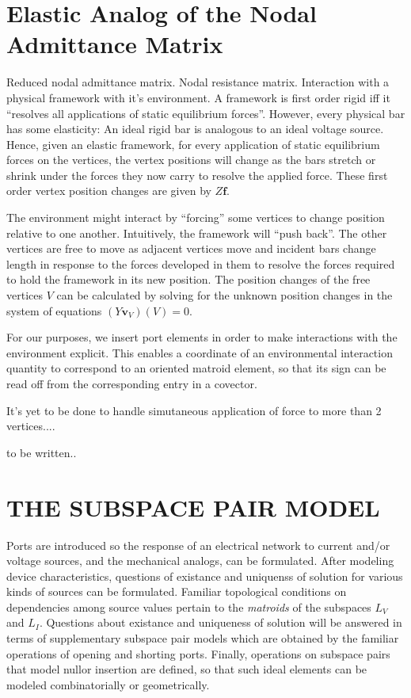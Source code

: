 \documentclass{article}
\newcommand{\extra}[1]{{\small{#1}}}
\begin{document}
\extra{\section{Elastic Analog of the Nodal Admittance Matrix}

Reduced nodal admittance matrix.  Nodal resistance matrix.
Interaction with a physical framework with it's environment.
A framework is first order rigid iff it ``resolves all applications of
static equilibrium forces''.  However, every physical bar has some
elasticity:  An ideal rigid bar is analogous to an ideal voltage 
source.  Hence, given an elastic framework, for every application
of static equilibrium forces on the vertices, the vertex positions
will change as the bars stretch or shrink under the forces they now
carry to resolve the applied force.  These first order vertex position 
changes are given by $Z\mathbf{f}$.

The environment might interact by ``forcing'' some vertices to change position
relative to one another.
Intuitively, the framework will ``push back''.  The other vertices are free
to move as adjacent vertices move and incident bars change length in
response to the forces developed in them to resolve the forces required
to hold the framework in its new position.  The position changes of the
free vertices $V$ can be calculated by solving for the unknown position changes
in the system of equations $(Y\mathbf{v}_V)(V)=0$.

For our purposes, we insert port elements in order to make interactions 
with the environment explicit.  This enables a coordinate of an 
environmental interaction quantity to correspond to an oriented matroid
element, so that its sign can be read off from the corresponding entry
in a covector.

It's yet to be done to handle simutaneous application of force to more 
than 2 vertices....



to be written..}


\section{THE SUBSPACE PAIR MODEL}

Ports are introduced so the response of an electrical network to current 
and/or voltage sources, and the mechanical analogs, can be formulated.
After modeling device characteristics, questions of existance and 
uniquenss of solution for various kinds of sources can be formulated.
Familiar topological conditions on dependencies among source values
pertain to the \textit{matroids} of the subspaces $L_V$ and $L_I$.
Questions about existance and uniqueness of solution
will be answered in terms of supplementary subspace pair models
which are obtained by the familiar operations of opening and shorting ports.
Finally, operations on subspace pairs that model nullor insertion are
defined, so that such ideal elements can be modeled combinatorially or
geometrically.  
\end{document}
